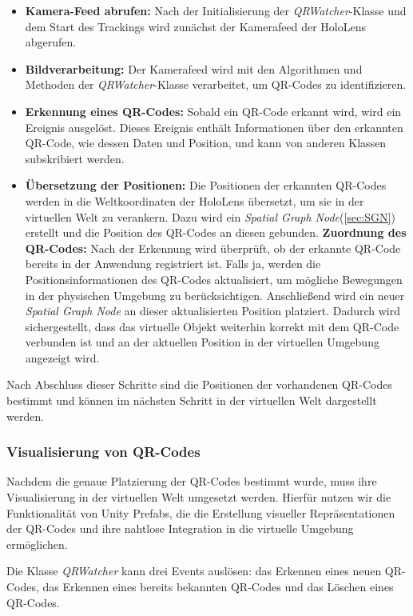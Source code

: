 \begin{itemize}
\begin{itemize}
    \item \textbf{Kamera-Feed abrufen:} Nach der Initialisierung der \textit{QRWatcher}-Klasse und dem Start des Trackings wird zunächst der Kamerafeed der HoloLens abgerufen.
    \item \textbf{Bildverarbeitung:} Der Kamerafeed wird mit den Algorithmen und Methoden der \textit{QRWatcher}-Klasse verarbeitet, um QR-Codes zu identifizieren.
    \item \textbf{Erkennung eines QR-Codes:} Sobald ein QR-Code erkannt wird, wird ein Ereignis ausgelöst. Dieses Ereignis enthält Informationen über den erkannten QR-Code, wie dessen Daten und Position, und kann von anderen Klassen subskribiert werden.
    \item \textbf{Übersetzung der Positionen:} Die Positionen der erkannten QR-Codes werden in die Weltkoordinaten der HoloLens übersetzt, um sie in der virtuellen Welt zu verankern. Dazu wird ein \textit{Spatial Graph Node}(\ref{sec:SGN}) erstellt und die Position des QR-Codes an diesen gebunden.
    \textbf{Zuordnung des QR-Codes:} Nach der Erkennung wird überprüft, ob der erkannte QR-Code bereits in der Anwendung registriert ist. Falls ja, werden die Positionsinformationen des QR-Codes aktualisiert, um mögliche Bewegungen in der physischen Umgebung zu berücksichtigen. Anschließend wird ein neuer \textit{Spatial Graph Node} an dieser aktualisierten Position platziert. Dadurch wird sichergestellt, dass das virtuelle Objekt weiterhin korrekt mit dem QR-Code verbunden ist und an der aktuellen Position in der virtuellen Umgebung angezeigt wird.
\end{itemize}

Nach Abschluss dieser Schritte sind die Positionen der vorhandenen QR-Codes bestimmt und können im nächsten Schritt in der virtuellen Welt dargestellt werden.

\subsubsection{\label{sec:qrvisualizer}Visualisierung von QR-Codes}
Nachdem die genaue Platzierung der QR-Codes bestimmt wurde, muss ihre Visualisierung in der virtuellen Welt umgesetzt werden. Hierfür nutzen wir die Funktionalität von Unity Prefabs, die die Erstellung visueller Repräsentationen der QR-Codes und ihre nahtlose Integration in die virtuelle Umgebung ermöglichen.

Die Klasse \textit{QRWatcher} kann drei Events auslösen: das Erkennen eines neuen QR-Codes, das Erkennen eines bereits bekannten QR-Codes und das Löschen eines QR-Codes.


\end{itemize}
